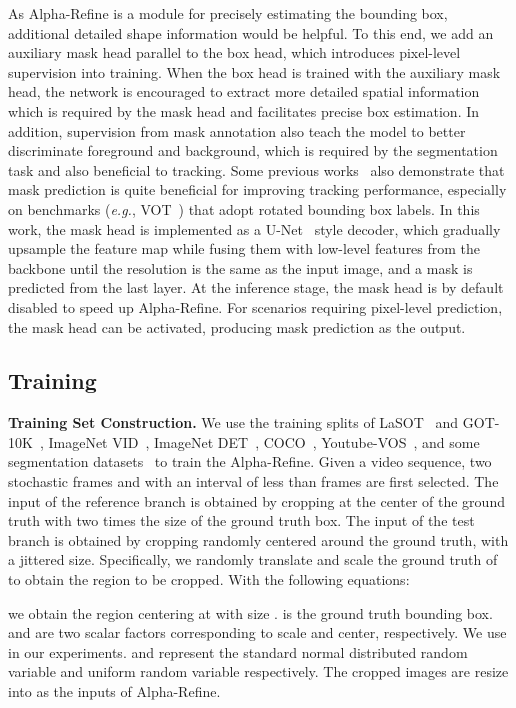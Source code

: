 \documentclass[final]{cvpr}
\begin{document}
As Alpha-Refine is a module for precisely estimating the bounding box, additional detailed shape information would be helpful. 
To this end, we add an auxiliary mask head parallel to the box head, which introduces pixel-level supervision into training.
When the box head is trained with the auxiliary mask head, the network is encouraged to extract more detailed spatial information 
which is required by the mask head and facilitates precise box estimation. 
In addition, supervision from mask annotation also teach the model to better discriminate foreground and background, 
which is required by the segmentation task and also beneficial to tracking.
Some previous works~\cite{SiamMask,D3S} also demonstrate that mask prediction is quite beneficial for improving tracking 
performance, especially on benchmarks (\emph{e.g.}, VOT~\cite{VOT2018,VOT2019}) that adopt rotated bounding box labels. 
In this work, the mask head is implemented as a U-Net~\cite{U-Net} style decoder, which gradually upsample the feature 
map while fusing them with low-level features from the backbone until the resolution is the same as the input image, 
and a mask is predicted from the last layer. At the inference stage, the mask head is by default disabled to speed up 
Alpha-Refine. For scenarios requiring pixel-level prediction, the mask head can be activated, producing mask prediction as the output.


\subsection{Training}
{\flushleft \textbf{Training Set Construction.}} We use the training splits of LaSOT~\cite{LaSOT} and 
GOT-10K~\cite{GOT10K}, ImageNet VID~\cite{ImageNet}, ImageNet DET~\cite{ImageNet}, COCO~\cite{COCO}, 
Youtube-VOS~\cite{youtube-vos}, and some segmentation datasets~\cite{DUT-OMRON,DUTS,ECSSD} 
to train the Alpha-Refine. 
Given a video sequence, two stochastic frames  and  with an interval of less than 
 frames are first selected. 
The input of the reference branch is obtained by cropping  at the center of the ground truth 
with two times the size of the ground truth box. 
The input of the test branch is obtained by cropping  randomly centered around the ground truth, 
with a jittered size. 
Specifically, we randomly translate and scale the ground truth of  to obtain the region 
to be cropped.
With the following equations:




we obtain the region centering at  with size . 
 is the ground truth bounding box.
 and  are two scalar factors corresponding to scale and center, respectively. 
We use  in our experiments. 
 and  represent the  standard normal distributed random variable and  
uniform random variable respectively. 
The cropped images are resize into  as the inputs of Alpha-Refine. 
\end{document}
